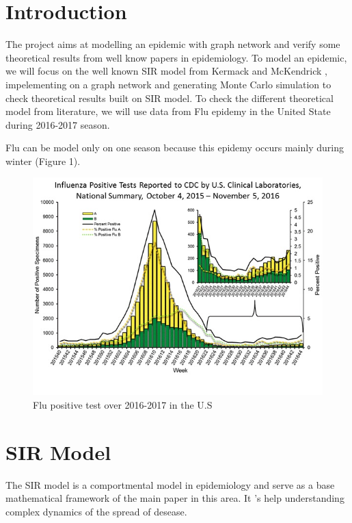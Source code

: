 \section{Introduction}

The project aims at modelling an epidemic with graph network and verify some theoretical results from well know papers in epidemiology. To model an epidemic, we will focus on the well known SIR model from Kermack and McKendrick \cite{Kermack700}, impelementing on a graph network and generating Monte Carlo simulation to check theoretical results built on SIR model. 
To check the different theoretical model from literature, we will use data from Flu epidemy in the United State during 2016-2017 season.

Flu can be model only on one season because this epidemy occurs mainly during winter (Figure 1).

\begin{figure}
    \centering
    \includegraphics[scale=0.5]{WHONPHL44_small.jpg}
    \caption{Flu positive test over 2016-2017 in the U.S}
    \label{fig:my_label}
\end{figure}



\section{SIR Model}

The SIR model is a comportmental model in epidemiology and serve as a base mathematical framework of the main paper in this area. It 's help understanding complex dynamics of the spread of desease.

